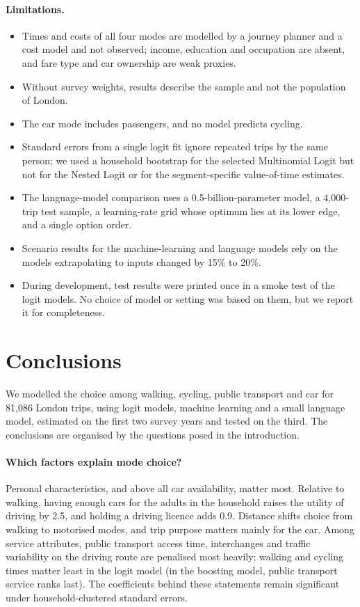 \documentclass[11pt,a4paper]{article}
\begin{document}
\paragraph{Limitations.}
\begin{itemize}
\item Times and costs of all four modes are modelled by a journey planner and a cost model and not observed; income, education and occupation are absent, and fare type and car ownership are weak proxies.
\item Without survey weights, results describe the sample and not the population of London.
\item The car mode includes passengers, and no model predicts cycling.
\item Standard errors from a single logit fit ignore repeated trips by the same person; we used a household bootstrap for the selected Multinomial Logit but not for the Nested Logit or for the segment-specific value-of-time estimates.
\item The language-model comparison uses a 0.5-billion-parameter model, a 4,000-trip test sample, a learning-rate grid whose optimum lies at its lower edge, and a single option order.
\item Scenario results for the machine-learning and language models rely on the models extrapolating to inputs changed by 15\% to 20\%.
\item During development, test results were printed once in a smoke test of the logit models. No choice of model or setting was based on them, but we report it for completeness.
\end{itemize}

\section{Conclusions}
\label{sec:conclusions}

We modelled the choice among walking, cycling, public transport and car for 81,086 London trips, using logit models, machine learning and a small language model, estimated on the first two survey years and tested on the third. The conclusions are organised by the questions posed in the introduction.

\paragraph{Which factors explain mode choice?}
Personal characteristics, and above all car availability, matter most. Relative to walking, having enough cars for the adults in the household raises the utility of driving by 2.5, and holding a driving licence adds 0.9. Distance shifts choice from walking to motorised modes, and trip purpose matters mainly for the car. Among service attributes, public transport access time, interchanges and traffic variability on the driving route are penalised most heavily; walking and cycling times matter least in the logit model (in the boosting model, public transport service ranks last). The coefficients behind these statements remain significant under household-clustered standard errors.
\end{document}
